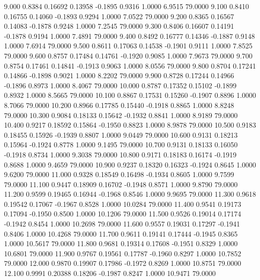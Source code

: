    9.000   0.8384   0.16692   0.13958  -0.1895   0.9316   1.0000   6.9515  79.0000
   9.100   0.8410   0.16755   0.14060  -0.1893   0.9294   1.0000   7.0522  79.0000
   9.200   0.8365   0.16567   0.14083  -0.1878   0.9248   1.0000   7.2545  79.0000
   9.300   0.8406   0.16607   0.14191  -0.1878   0.9194   1.0000   7.4891  79.0000
   9.400   0.8492   0.16777   0.14346  -0.1887   0.9148   1.0000   7.6914  79.0000
   9.500   0.8611   0.17063   0.14538  -0.1901   0.9111   1.0000   7.8525  79.0000
   9.600   0.8757   0.17484   0.14761  -0.1920   0.9085   1.0000   7.9673  79.0000
   9.700   0.8754   0.17461   0.14841  -0.1913   0.9063   1.0000   8.0556  79.0000
   9.800   0.8704   0.17241   0.14866  -0.1898   0.9021   1.0000   8.2202  79.0000
   9.900   0.8728   0.17244   0.14966  -0.1896   0.8973   1.0000   8.4067  79.0000
  10.000   0.8787   0.17352   0.15102  -0.1899   0.8932   1.0000   8.5665  79.0000
  10.100   0.8867   0.17531   0.15260  -0.1907   0.8896   1.0000   8.7066  79.0000
  10.200   0.8966   0.17785   0.15440  -0.1918   0.8865   1.0000   8.8248  79.0000
  10.300   0.9084   0.18133   0.15642  -0.1932   0.8841   1.0000   8.9189  79.0000
  10.400   0.9217   0.18592   0.15864  -0.1950   0.8823   1.0000   8.9878  79.0000
  10.500   0.9183   0.18455   0.15926  -0.1939   0.8807   1.0000   9.0449  79.0000
  10.600   0.9131   0.18213   0.15964  -0.1924   0.8778   1.0000   9.1495  79.0000
  10.700   0.9131   0.18133   0.16050  -0.1918   0.8734   1.0000   9.3038  79.0000
  10.800   0.9171   0.18183   0.16174  -0.1919   0.8688   1.0000   9.4659  79.0000
  10.900   0.9237   0.18320   0.16323  -0.1924   0.8645   1.0000   9.6200  79.0000
  11.000   0.9328   0.18549   0.16498  -0.1934   0.8605   1.0000   9.7599  79.0000
  11.100   0.9447   0.18909   0.16702  -0.1948   0.8571   1.0000   9.8790  79.0000
  11.200   0.9599   0.19465   0.16944  -0.1968   0.8546   1.0000   9.9695  79.0000
  11.300   0.9618   0.19542   0.17067  -0.1967   0.8528   1.0000  10.0284  79.0000
  11.400   0.9541   0.19173   0.17094  -0.1950   0.8500   1.0000  10.1206  79.0000
  11.500   0.9526   0.19014   0.17174  -0.1942   0.8454   1.0000  10.2698  79.0000
  11.600   0.9557   0.19031   0.17297  -0.1941   0.8406   1.0000  10.4268  79.0000
  11.700   0.9611   0.19141   0.17444  -0.1945   0.8365   1.0000  10.5617  79.0000
  11.800   0.9681   0.19314   0.17608  -0.1951   0.8329   1.0000  10.6801  79.0000
  11.900   0.9767   0.19561   0.17787  -0.1960   0.8297   1.0000  10.7852  79.0000
  12.000   0.9870   0.19907   0.17986  -0.1972   0.8269   1.0000  10.8751  79.0000
  12.100   0.9991   0.20388   0.18206  -0.1987   0.8247   1.0000  10.9471  79.0000
